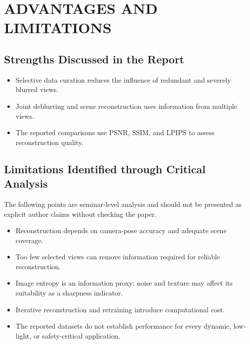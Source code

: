 \chapter{\MakeUppercase{Advantages and Limitations}}
\setcounter{equation}{0}

\section{Strengths Discussed in the Report}
\begin{itemize}
\item Selective data curation reduces the influence of redundant and severely blurred views.
\item Joint deblurring and scene reconstruction uses information from multiple views.
\item The reported comparisons use PSNR, SSIM, and LPIPS to assess reconstruction quality.
\end{itemize}
\section{Limitations Identified through Critical Analysis}
The following points are seminar-level analysis and should not be presented as explicit author claims without checking the paper.
\begin{itemize}
\item Reconstruction depends on camera-pose accuracy and adequate scene coverage.
\item Too few selected views can remove information required for reliable reconstruction.
\item Image entropy is an information proxy; noise and texture may affect its suitability as a sharpness indicator.
\item Iterative reconstruction and retraining introduce computational cost.
\item The reported datasets do not establish performance for every dynamic, low-light, or safety-critical application.
\end{itemize}
